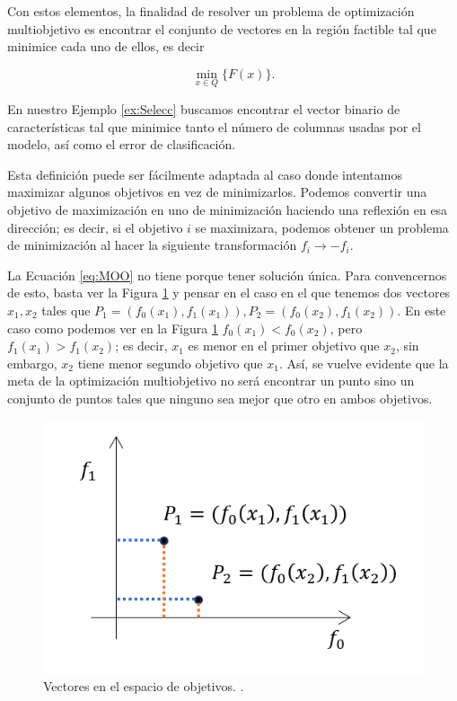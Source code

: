 Con estos elementos, la finalidad de resolver un problema de optimización multiobjetivo es encontrar el conjunto de vectores en la región factible tal que minimice cada uno de ellos, es decir

\begin{equation} \label{eq:MOO}
    \min_{x\in Q} \{F(x)\}.
\end{equation}

En nuestro Ejemplo \ref{ex:Selecc} buscamos encontrar el vector binario de características tal que minimice tanto el número de columnas usadas por el modelo, así como el error de clasificación. 

Esta definición puede ser fácilmente adaptada al caso donde intentamos maximizar algunos objetivos en vez de minimizarlos. Podemos convertir una objetivo de maximización en uno de minimización haciendo una reflexión en esa dirección; es decir, si el objetivo $i$ se maximizara, podemos obtener un problema de minimización al hacer la siguiente transformación $f_i \rightarrow -f_i$. 

La Ecuación \eqref{eq:MOO} no tiene porque tener solución única. Para convencernos de esto, basta ver la Figura \ref{fig:pareto} y pensar en el caso en el que tenemos dos vectores $x_1, x_2$ tales que $P_1=(f_0(x_1),f_1(x_1)), P_2=(f_0(x_2),f_1(x_2))$. En este caso como podemos ver en la Figura \ref{fig:pareto} $f_0(x_1)< f_0(x_2)$, pero $f_1(x_1) > f_1(x_2)$; es decir, $x_1$ es menor en el primer objetivo que $x_2$, sin embargo, $x_2$ tiene menor segundo objetivo que $x_1$. Así, se vuelve evidente que la meta de la optimización multiobjetivo no será encontrar un punto sino un conjunto de puntos tales que ninguno sea mejor que otro en ambos objetivos.

\begin{figure}[H]
    \centering
    \includegraphics[scale=.5]{Figuras/pareto.png}
    \caption[Vectores en el espacio de objetivos]{Vectores en el espacio de objetivos. .}
    \label{fig:pareto}
\end{figure}



